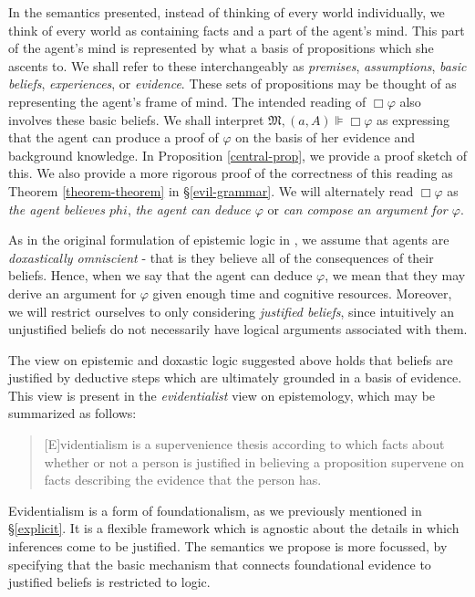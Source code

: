 \documentclass[11pt,titlepage]{report}
\numberwithin{equation}{subsection}
\newcommand{\Nec}{\Box}
\renewcommand{\phi}{\varphi}
\begin{document}
In the semantics presented, instead of thinking of every world individually, we think of
every world as containing facts and a part of the agent's mind.  
This part of the agent's mind is represented by what a basis of propositions which she ascents to. We shall refer to these
interchangeably as \emph{premises}, \emph{assumptions}, \emph{basic
  beliefs}, \emph{experiences}, or \emph{evidence}.  These sets of
propositions may be thought of as representing the agent's frame of mind.
The intended reading of $\Nec \phi$ also involves these basic
beliefs. We shall interpret $\mathfrak{M},(a,A)\VDash \Nec \phi$
 as expressing that the agent can produce a proof of $\phi$ on the
 basis of her evidence and background knowledge.  
 In Proposition \ref{central-prop}, we provide a proof sketch of this.
 We also provide a more rigorous proof of the correctness of
 this reading as Theorem \ref{theorem-theorem} in \S\ref{evil-grammar}.
 We will alternately read $\Nec \phi$ as \emph{the agent believes $phi$}, 
 \emph{the agent can deduce $\phi$} or
 \emph{can compose an argument for $\phi$}.  
 
As in the original formulation of epistemic
 logic in \cite{hintikka_knowledge_1969}, we assume that 
 agents are \emph{doxastically omniscient} - that is they 
 believe all of the consequences of their beliefs.  Hence, when we
 say that the agent can deduce $\phi$, we mean that they may 
 derive an argument for $\phi$ given enough time and cognitive
 resources.  Moreover, we will restrict ourselves to only considering
 \emph{justified beliefs}, since intuitively an unjustified beliefs do
 not necessarily have logical arguments associated with them.

 The view on epistemic and doxastic logic suggested above holds 
 that beliefs are justified by deductive steps which are ultimately
 grounded in a basis of evidence. 
  This view is present in the \emph{evidentialist} view on
  epistemology, which may be summarized as follows:
 \begin{quote}
  [E]videntialism is a supervenience thesis according to which facts
  about whether or not a person is justified in believing a
  proposition supervene on facts describing the evidence that the
  person has. \citet[pg. 5]{conee_evidentialism_2004}
 \end{quote}
Evidentialism is a form of foundationalism, as we previously mentioned
in \S\ref{explicit}.  It is a flexible framework which
is agnostic about the details in which inferences come to be
justified. The semantics we propose is more focussed,
by specifying that the basic mechanism that connects foundational evidence 
to justified beliefs is restricted to logic.  
\end{document}
